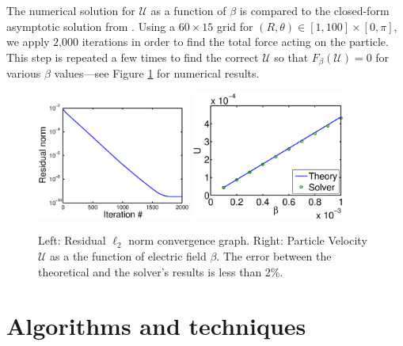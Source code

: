 \documentclass[12pt]{article}
\newcommand{\cl}[1]{\ensuremath{\mathcal{#1}}}
\begin{document}
The numerical solution for $\cl{U}$ as a function of $\beta$ is
compared to the closed-form asymptotic solution from
\cite{yariv2010migration}. Using a $60 \times 15$ grid for $(R,\theta) \in
[1, 100] \times [0, \pi]$, we apply $2\mathord{,}000$ iterations
in order to find the total force acting on the particle. This step
is repeated a few times to find the correct $\cl{U}$ so that
$F_\beta(\cl{U}) = 0$ for various $\beta$ values---see Figure
\ref{fig:Results} for numerical results.
\begin{figure}[htbp]
\begin{framed}
    \begin{center}
        \includegraphics[width=0.45\textwidth]
            {convergence.eps}
        \includegraphics[width=0.45\textwidth]
            {comparison.eps}
        \caption{Left: Residual $\ell_2$ norm convergence graph. Right: Particle Velocity
        $\cl{U}$ as a the function of electric field $\beta$.
        The error between the theoretical and the solver's results is less than 2\%.}
        \label{fig:Results}
    \end{center}
\end{framed}
\end{figure}

\section{Algorithms and techniques}
\end{document}
